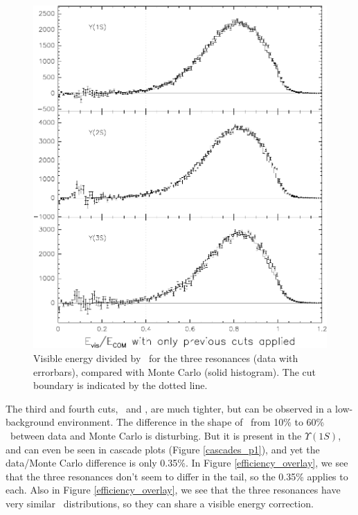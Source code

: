 \begin{figure}
  \includegraphics[width=\linewidth]{plots/efficiency_visen}
  \caption{\label{efficiency_visen} Visible energy divided by \ecom\
    for the three resonances (data with errorbars), compared with
    Monte Carlo (solid histogram).  The cut boundary is indicated by
    the dotted line.}
\end{figure}

The third and fourth cuts, \pone\ and \visen, are much tighter, but
can be observed in a low-background environment.  The difference in
the shape of \pone\ from 10\% to 60\% \ebeam\ between data and Monte
Carlo is disturbing.  But it is present in the $\Upsilon(1S)$, and can
even be seen in cascade plots (Figure \ref{cascades_p1}), and yet the
data/Monte Carlo difference is only 0.35\%.  In Figure
\ref{efficiency_overlay}, we see that the three resonances don't seem
to differ in the tail, so the 0.35\% applies to each.  Also in Figure
\ref{efficiency_overlay}, we see that the three resonances have very
similar \visen\ distributions, so they can share a visible energy
correction.

